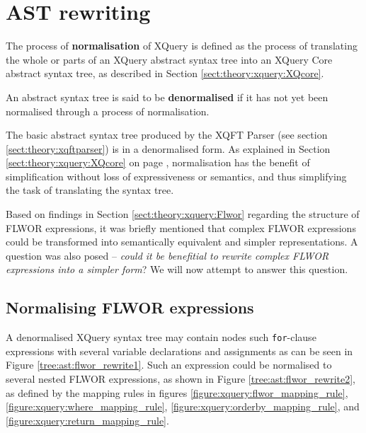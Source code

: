 \section{AST rewriting}
\label{sect:method:ast_rewrite}
\begin{myDefinition}
\label{definition:normalisation}
The process of \textbf{normalisation} of XQuery is defined as the process of
translating the whole or parts of an XQuery abstract syntax tree into an XQuery Core abstract
syntax tree, as described in Section \ref{sect:theory:xquery:XQcore}.
\end{myDefinition}

\begin{myDefinition}
\label{definition:denormalised}
An abstract syntax tree is said to be \textbf{denormalised} if it has not yet
been normalised through a process of normalisation.
\end{myDefinition}

The basic abstract syntax tree produced by the XQFT Parser (see section
\ref{sect:theory:xqftparser}) is in a denormalised form. As explained in
Section \ref{sect:theory:xquery:XQcore} on page
\pageref{sect:theory:xquery:XQcore}, normalisation has the benefit of
simplification without loss of expressiveness or semantics, and thus
simplifying the task of translating the syntax tree.

Based on findings in Section \ref{sect:theory:xquery:Flwor} regarding the
structure of FLWOR expressions, it was briefly mentioned that complex FLWOR
expressions could be transformed into semantically equivalent and simpler
representations. A question was also posed -- \emph{could it be
benefitial to rewrite complex FLWOR expressions into a simpler form}? We will
now attempt to answer this question.

\subsection{Normalising FLWOR expressions}
A denormalised XQuery syntax tree may contain nodes such \texttt{for}-clause expressions with several variable
declarations and assignments as can be seen in Figure \ref{tree:ast:flwor_rewrite1}. Such an expression could be
normalised to several nested FLWOR expressions, as shown in Figure \ref{tree:ast:flwor_rewrite2}, as defined by
the mapping rules in figures \ref{figure:xquery:flwor_mapping_rule},
\ref{figure:xquery:where_mapping_rule},
\ref{figure:xquery:orderby_mapping_rule}, and
\ref{figure:xquery:return_mapping_rule}.

